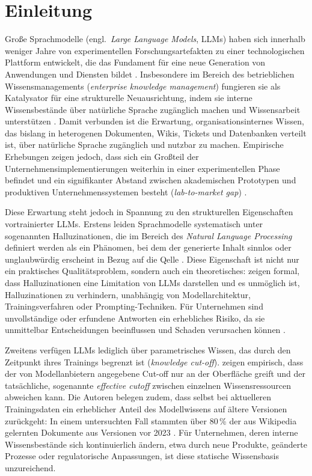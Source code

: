 \section{Einleitung}
\label{sec:einleitung}
Große Sprachmodelle (engl.\ \textit{Large Language Models}, LLMs) haben sich innerhalb weniger 
Jahre von experimentellen Forschungsartefakten zu einer technologischen Plattform entwickelt, 
die das Fundament für eine neue Generation von Anwendungen und Diensten bildet \autocite[72]{OLeary.2024}. 
Insbesondere im Bereich des betrieblichen Wissensmanagements (\textit{enterprise knowledge management}) 
fungieren sie als Katalysator für eine strukturelle Neuausrichtung, indem sie interne 
Wissensbestände über natürliche Sprache zugänglich machen und Wissensarbeit unterstützen 
\autocite[72]{OLeary.2024}. Damit verbunden ist die Erwartung, organisationsinternes Wissen, das bislang in heterogenen Dokumenten, Wikis, Tickets und Datenbanken verteilt ist, über natürliche Sprache zugänglich und nutzbar zu machen. Empirische Erhebungen zeigen jedoch, dass sich ein Großteil der Unternehmensimplementierungen weiterhin in einer experimentellen Phase befindet und ein signifikanter Abstand zwischen akademischen Prototypen und produktiven Unternehmenssystemen besteht (\textit{lab-to-market gap}) \autocite[1]{Karakurt.2026}.

Diese Erwartung steht jedoch in Spannung zu den strukturellen Eigenschaften vortrainierter 
LLMs. Erstens leiden Sprachmodelle systematisch unter sogenannten Halluzinationen, 
die im Bereich des \textit{Natural Language Processing} definiert werden als ein Phänomen, bei dem der generierte Inhalt sinnlos oder unglaubwürdig erscheint in Bezug auf die Qelle \autocite[1:5]{Huang.2024}. 
Diese Eigenschaft ist nicht nur ein praktisches Qualitätsproblem, sondern auch ein  theoretisches: \textcite[1]{Xu.2025} zeigen formal, dass Halluzinationen eine 
Limitation von LLMs darstellen und es unmöglich ist, Halluzinationen zu verhindern, unabhängig von Modellarchitektur, Trainingsverfahren oder Prompting-Techniken. Für Unternehmen sind unvollständige oder erfundene Antworten ein erhebliches Risiko, da sie unmittelbar Entscheidungen beeinflussen und Schaden verursachen können \autocite[1 f.]{Huang.2024}.

Zweitens verfügen LLMs lediglich über parametrisches Wissen, das durch den Zeitpunkt ihres  Trainings begrenzt ist (\textit{knowledge cut-off}). \textcite[1]{Cheng.2024} zeigen empirisch, dass der von Modellanbietern angegebene Cut-off nur an der Oberfläche greift und der tatsächliche, sogenannte \textit{effective cutoff} zwischen einzelnen Wissensressourcen abweichen kann. Die Autoren belegen zudem, dass selbst bei aktuelleren Trainingsdaten ein erheblicher Anteil des Modellwissens auf ältere Versionen zurückgeht: In einem untersuchten Fall stammten über 80\,\% der aus Wikipedia
gelernten Dokumente aus Versionen vor 2023 \autocite[9 f.]{Cheng.2024}. Für Unternehmen, deren interne Wissensbestände sich kontinuierlich ändern, etwa durch neue Produkte, geänderte Prozesse oder regulatorische Anpassungen, ist diese statische Wissensbasis unzureichend.

